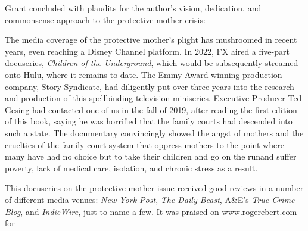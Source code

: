 \noindent{}Grant concluded with plaudits for the author's vision, dedication, and
commonsense approach to the protective mother crisis:

\vspace{-.5em}
 \pfl{}



\noindent{}The media coverage of the protective mother’s plight has mushroomed
in recent years, even reaching a Disney Channel platform. In 2022, FX
aired a five-part docuseries, \textit{Children of the Underground}, which would
be subsequently streamed onto Hulu, where it remains to date. The
Emmy Award-winning production company, Story Syndicate, had diligently 
put over three years into the research and production of this
spellbinding television miniseries. Executive Producer Ted Gesing had
contacted one of us in the fall of 2019, after reading the first edition of
this book, saying he was horrified that the family courts had descended
into such a state. The documentary convincingly showed the angst of
mothers and the cruelties of the family court system that oppress 
mothers to the point where many have had no choice but to take their children
and go on the run\mdash{}and suffer
poverty, lack of medical care, isolation, and chronic
stress as a result. \pfl{}

This docuseries on the protective mother issue received good reviews
in a number of different media venues: \textit{New York Post}, 
\textit{The Daily Beast},
A\&E's \textit{True Crime Blog}, and \textit{IndieWire}, 
just to name a few. It was praised
on www.rogerebert.com for \hspace{1pt} \pfl{}

